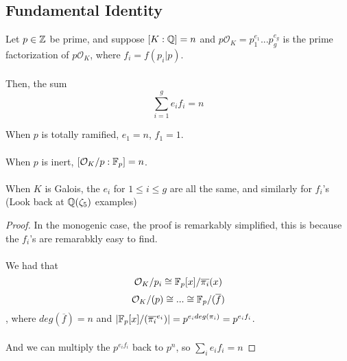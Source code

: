 \subsection{Fundamental Identity}

\begin{theorem}
Let $p \in \mathbb{Z}$ be prime, and suppose $[K: \mathbb{Q}] = n$ and $p \mathcal{O}_K = p_1^{e_1} ... p_g^{e_g}$ is the prime factorization of $p \mathcal{O}_K$, where $f_i = f(p_i | p)$.\\\\
Then, the sum
\[\sum_{i = 1}^g e_i f_i = n\]
\end{theorem}

\begin{remark}
When $p$ is totally ramified, $e_1 = n$, $f_1 = 1$.\\\\
When $p$ is inert, $[\mathcal{O}_K/p : \mathbb{F}_p] = n$.\\\\
When $K$ is Galois, the $e_i$ for $1 \leq i \leq g$ are all the same, and similarly for $f_i$'s (Look back at $\mathbb{Q}(\zeta_5)$ examples)
\end{remark}

\begin{proof}
In the monogenic case, the proof is remarkably simplified, this is because the $f_i$'s are remarabkly easy to find.\\\\
We had that
\[\mathcal{O}_K/p_i \cong \mathbb{F}_p[x]/\overline{\pi_i}(x)\]
\[\mathcal{O}_K/(p) \cong ... \cong \mathbb{F}_p/(\overline{f})\]
, where $deg(\overline{f}) = n$ and $|\mathbb{F}_p[x]/(\overline{\pi_i}^{e_i})| = p^{e_i deg(\pi_i)} = p^{e_i f_i}$.\\\\
And we can multiply the $p^{e_i f_i}$ back to $p^n$, so $\sum_i e_i f_i = n$
\end{proof}